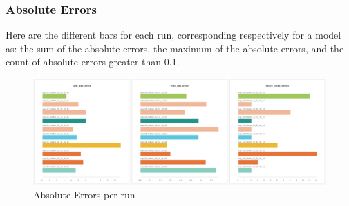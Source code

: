 \documentclass[11pt]{article}
\begin{document}
\subsubsection{Absolute Errors}
\label{sec:orgeaa540a}

Here are the different bars for each run, corresponding respectively for a model as: the sum of the absolute errors, the maximum of the absolute errors, and the count of absolute errors greater than 0.1.\\[0pt]

\begin{figure}[htbp]
\centering
\includegraphics[width=.9\linewidth]{img/bar_errors.png}
\caption{Absolute Errors per run}
\end{figure}\\[0pt]
\end{document}
